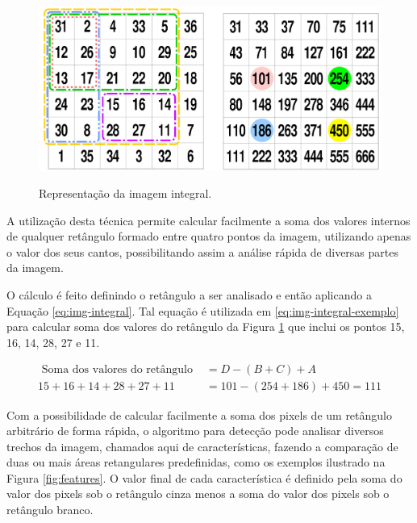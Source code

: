 \begin{figure}[htb]
    \centering
    \caption{Representação da imagem integral.}
    \includegraphics[scale=.3]{figs/imagem-integral.png}
    \label{fig:integral}
\end{figure}

A utilização desta técnica permite calcular facilmente a soma dos valores internos de qualquer retângulo formado entre quatro pontos da imagem, utilizando apenas o valor dos seus cantos, possibilitando assim a análise rápida de diversas partes da imagem.

O cálculo é feito definindo o retângulo a ser analisado e então aplicando a Equação \ref{eq:img-integral}. Tal equação é utilizada em \ref{eq:img-integral-exemplo} para calcular soma dos valores do retângulo da Figura \ref{fig:integral} que inclui os pontos 15, 16, 14, 28, 27 e 11.

\begin{align}\label{eq:img-integral}
    \text{ Soma dos valores do retângulo } & = D - (B + C) + A               \\
    \label{eq:img-integral-exemplo}
    15 + 16 + 14 + 28 + 27 + 11            & = 101 - (254 + 186) + 450 = 111
\end{align}

Com a possibilidade de calcular facilmente a soma dos pixels de um retângulo arbitrário de forma rápida, o algoritmo para detecção pode analisar diversos trechos da imagem, chamados aqui de características, fazendo a comparação de duas ou mais áreas retangulares predefinidas, como os exemplos ilustrado na Figura \ref{fig:features}. O valor final de cada característica é definido pela soma do valor dos pixels sob o retângulo cinza menos a soma do valor dos pixels sob o retângulo branco.

